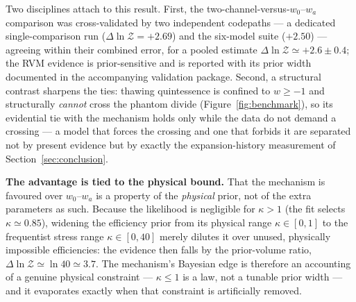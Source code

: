 \documentclass[11pt,a4paper]{article}
\begin{document}
Two disciplines attach to this result. First, the two-channel-versus-$w_0$--$w_a$ comparison was cross-validated by two independent codepaths --- a dedicated single-comparison run ($\Delta\ln\mathcal{Z}=+2.69$) and the six-model suite ($+2.50$) --- agreeing within their combined error, for a pooled estimate $\Delta\ln\mathcal{Z}\simeq+2.6\pm0.4$; the RVM evidence is prior-sensitive and is reported with its prior width documented in the accompanying validation package. Second, a structural contrast sharpens the ties: thawing quintessence is confined to $w\ge-1$ and structurally \emph{cannot} cross the phantom divide (Figure~\ref{fig:benchmark}), so its evidential tie with the mechanism holds only while the data do not demand a crossing --- a model that forces the crossing and one that forbids it are separated not by present evidence but by exactly the expansion-history measurement of Section~\ref{sec:conclusion}.

\textbf{The advantage is tied to the physical bound.} That the mechanism is favoured over $w_0$--$w_a$ is a property of the \emph{physical} prior, not of the extra parameters as such. Because the likelihood is negligible for $\kappa>1$ (the fit selects $\kappa\simeq0.85$), widening the efficiency prior from its physical range $\kappa\in[0,1]$ to the frequentist stress range $\kappa\in[0,40]$ merely dilutes it over unused, physically impossible efficiencies: the evidence then falls by the prior-volume ratio, $\Delta\ln\mathcal{Z}\simeq\ln 40\simeq3.7$. The mechanism's Bayesian edge is therefore an accounting of a genuine physical constraint --- $\kappa\le1$ is a law, not a tunable prior width --- and it evaporates exactly when that constraint is artificially removed.
\end{document}
